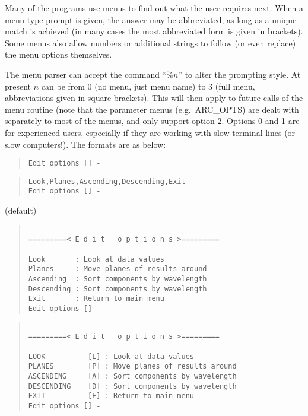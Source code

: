 Many of the programs use menus to find out what the user requires next.
When a menu-type prompt is given, the answer may be abbreviated, as long
as a unique match is achieved (in many cases the most abbreviated form
is given in brackets).
Some menus also allow numbers or additional strings to follow (or even
replace) the menu options themselves.

The menu parser can accept the command ``\%$n$'' to alter the prompting
style.
At present $n$ can be from 0 (no menu, just menu name) to 3 (full menu,
abbreviations given in square brackets).
This will then apply to future calls of the menu routine (note that the
parameter menus (e.g.\ ARC\_OPTS) are dealt with separately to most of
the menus, and only support option 2.
Options 0 and 1 are for experienced users, especially if they are
working with slow terminal lines (or slow computers!).
The formats are as below:
\begin{list}{Option :}{}
\setcounter{menus}{0}
\item[Option 0]
\hspace*{150 mm}
\begin{quote}\begin{verbatim}
Edit options [] -
\end{verbatim}\end{quote}
\item\samepage
\hspace*{150 mm}
\begin{quote}\begin{verbatim}
Look,Planes,Ascending,Descending,Exit
Edit options [] -
\end{verbatim}\end{quote}
\item (default)
\hspace*{150 mm}
\begin{quote}\begin{verbatim}

=========< E d i t   o p t i o n s >=========

Look       : Look at data values
Planes     : Move planes of results around
Ascending  : Sort components by wavelength
Descending : Sort components by wavelength
Exit       : Return to main menu
Edit options [] -
\end{verbatim}\end{quote}
\item
\hspace*{150 mm}
\begin{quote}\begin{verbatim}

=========< E d i t   o p t i o n s >=========

LOOK          [L] : Look at data values
PLANES        [P] : Move planes of results around
ASCENDING     [A] : Sort components by wavelength
DESCENDING    [D] : Sort components by wavelength
EXIT          [E] : Return to main menu
Edit options [] -
\end{verbatim}\end{quote}
\end{list}
